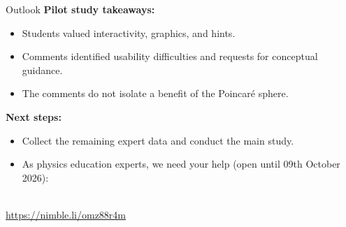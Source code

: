 \begin{frame}{Outlook}
\textbf{Pilot study takeaways:} 
\begin{itemize}
    \item Students valued interactivity, graphics, and hints.
    \item Comments identified usability difficulties and requests for conceptual guidance.
    \item The comments do not isolate a benefit of the Poincaré sphere.
\end{itemize}
\textbf{Next steps:} 
\begin{itemize}
    \item Collect the remaining expert data and conduct the main study.
    \item As physics education experts, we need your help (open until 09th October 2026): 
\end{itemize}
\centering
{} \\
\url{https://nimble.li/omz88r4m}
\end{frame}


